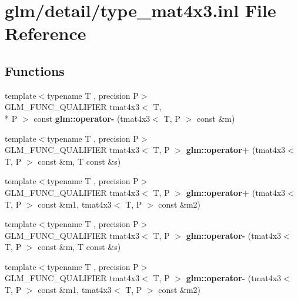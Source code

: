\hypertarget{type__mat4x3_8inl}{\section{glm/detail/type\-\_\-mat4x3.inl File Reference}
\label{type__mat4x3_8inl}
}
\subsection*{Functions}
\begin{DoxyCompactItemize}
\item 
\hypertarget{namespaceglm_a827be0f5eae87a7fac84dab962c9b500}{{\footnotesize template$<$typename T , precision P$>$ }\\G\-L\-M\-\_\-\-F\-U\-N\-C\-\_\-\-Q\-U\-A\-L\-I\-F\-I\-E\-R tmat4x3$<$ T, \\*
P $>$ const {\bfseries glm\-::operator-\/} (tmat4x3$<$ T, P $>$ const \&m)}\label{namespaceglm_a827be0f5eae87a7fac84dab962c9b500}

\item 
\hypertarget{namespaceglm_a876e75ebc71288bb2eef6eb29918f14a}{{\footnotesize template$<$typename T , precision P$>$ }\\G\-L\-M\-\_\-\-F\-U\-N\-C\-\_\-\-Q\-U\-A\-L\-I\-F\-I\-E\-R tmat4x3$<$ T, P $>$ {\bfseries glm\-::operator+} (tmat4x3$<$ T, P $>$ const \&m, T const \&s)}\label{namespaceglm_a876e75ebc71288bb2eef6eb29918f14a}

\item 
\hypertarget{namespaceglm_ac3869c4747532b81543c0bf725251546}{{\footnotesize template$<$typename T , precision P$>$ }\\G\-L\-M\-\_\-\-F\-U\-N\-C\-\_\-\-Q\-U\-A\-L\-I\-F\-I\-E\-R tmat4x3$<$ T, P $>$ {\bfseries glm\-::operator+} (tmat4x3$<$ T, P $>$ const \&m1, tmat4x3$<$ T, P $>$ const \&m2)}\label{namespaceglm_ac3869c4747532b81543c0bf725251546}

\item 
\hypertarget{namespaceglm_afcb0d386fe4230e7be47ef8bc7eac70b}{{\footnotesize template$<$typename T , precision P$>$ }\\G\-L\-M\-\_\-\-F\-U\-N\-C\-\_\-\-Q\-U\-A\-L\-I\-F\-I\-E\-R tmat4x3$<$ T, P $>$ {\bfseries glm\-::operator-\/} (tmat4x3$<$ T, P $>$ const \&m, T const \&s)}\label{namespaceglm_afcb0d386fe4230e7be47ef8bc7eac70b}

\item 
\hypertarget{namespaceglm_a3366016f32730b6590831628678f7a75}{{\footnotesize template$<$typename T , precision P$>$ }\\G\-L\-M\-\_\-\-F\-U\-N\-C\-\_\-\-Q\-U\-A\-L\-I\-F\-I\-E\-R tmat4x3$<$ T, P $>$ {\bfseries glm\-::operator-\/} (tmat4x3$<$ T, P $>$ const \&m1, tmat4x3$<$ T, P $>$ const \&m2)}\label{namespaceglm_a3366016f32730b6590831628678f7a75}


\end{DoxyCompactItemize}
